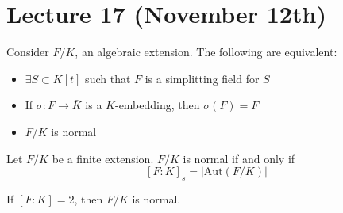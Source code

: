 \section{Lecture 17 (November 12th)}
\begin{thm}
Consider $F/K$, an algebraic extension. The following are equivalent:
\begin{itemize}
\item[(i)] $\exists S\subset K[t]$ such that $F$ is a simplitting field for $S$ 
\item[(ii)] If $\sigma :F\rightarrow \bar{K}$ is a $K$-embedding, then $\sigma (F)=F$
\item[(iii)] $F/K$ is normal
\end{itemize}
\end{thm}
\vspace{2ex}
\begin{cor}
Let $F/K$ be a finite extension. $F/K$ is normal if and only if 
\[[F:K]_{s}=|\mathrm{Aut}(F/K)|\]
\end{cor}
\vspace{2ex}
\begin{prop}
If $[F:K]=2$, then $F/K$ is normal.
\end{prop}
\vspace{2ex}
